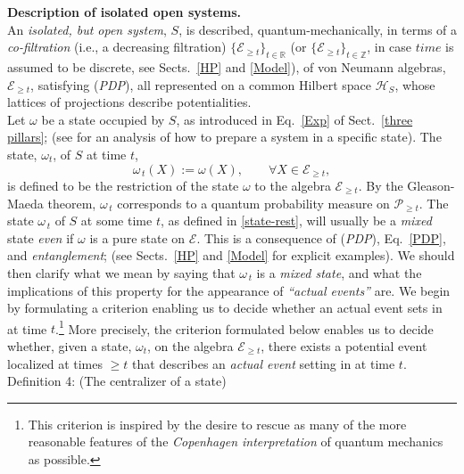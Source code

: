 \documentclass[12pt]{article}
\begin{document}
{\bf{Description of isolated open systems.}}\\

An \textit{isolated, but open system}, $S$, is described, quantum-mechanically, in terms of a \textit{co-filtration} (i.e., a decreasing filtration)
$\lbrace \mathcal{E}_{\geq t} \rbrace_{t \in \mathbb{R}}$ (or $\lbrace \mathcal{E}_{\geq t} \rbrace_{t \in \mathbb{Z}}$, in case $time$ is assumed to be discrete, see Sects.~\ref{HP} and \ref{Model}), of von
Neumann algebras, $\mathcal{E}_{\geq t}$, satisfying (\textit{PDP}), all represented on a common Hilbert space $\mathcal{H}_S$,
whose lattices of projections describe potentialities. \\

Let $\omega$ be a state occupied by $S$, as introduced in Eq.~\eqref{Exp} of Sect.~\ref{three pillars}; (see \cite{Fr-Schub} for an analysis of how to prepare a system in a specific state). The state,
$\omega_t$, of $S$ at time $t$,
\begin{equation}\label{state-rest}
\omega_{\,t}(X):= \omega(X), \qquad \forall X \in \mathcal{E}_{\geq t},
\end{equation}
is defined to be the restriction of the state $\omega$ to the algebra $\mathcal{E}_{\geq t}$. By the Gleason-Maeda theorem,
$\omega_{\,t}$
corresponds to a quantum probability measure on $\mathcal{P}_{\geq t}$. The state $\omega_{\,t}$ of $S$
at some time $t$, as defined in \eqref{state-rest}, will usually be a \textit{mixed} state  \textit{even} if $\omega$
is a pure state on $\mathcal{E}$. This is a consequence of (\textit{PDP}), Eq.~\eqref{PDP}, and \textit{entanglement}; (see Sects.~\ref{HP} and \ref{Model} for explicit examples). We should then clarify what we mean by saying that
$\omega_{\,t}$ is a \textit{mixed state}, and what the implications of this property for the appearance
of \textit{``actual events''} are.
We begin by formulating a criterion enabling us to decide whether an actual event sets in at time
$t$.\footnote{This criterion is inspired by the desire to rescue as many of the more reasonable features of the \textit{Copenhagen interpretation} of quantum mechanics as possible.} More precisely, the criterion formulated below
enables us to decide whether, given a state, $\omega_t$, on the algebra $\mathcal{E}_{\geq t}$, there exists a potential
event localized at times $\geq t$ that describes an \textit{actual event} setting in at time $t$.\\

{Definition 4}: (The centralizer of a state) \label{defcentralizer}
\end{document}
